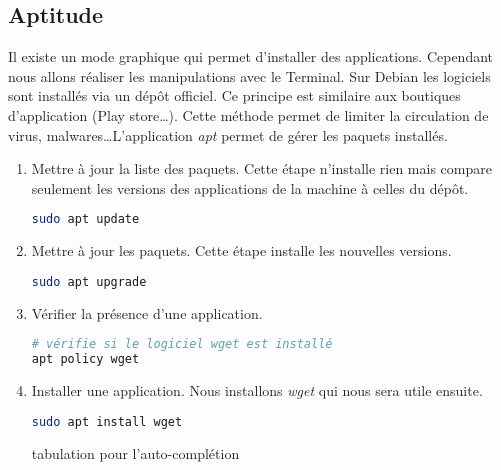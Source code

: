 \documentclass[a4paper,11pt]{article}
\begin{document}
\subsection{Aptitude}
Il existe un mode graphique qui permet d'installer des applications. Cependant nous allons réaliser les manipulations avec le Terminal. Sur Debian les logiciels sont installés via un dépôt officiel. Ce principe est similaire aux boutiques d'application (Play store\dots). Cette méthode permet de limiter la circulation de virus, malwares\dots L'application \emph{apt} permet de gérer les paquets installés.
\begin{activite}
\begin{enumerate}
    \item Mettre à jour la liste des paquets. Cette étape n'installe rien mais compare seulement les versions des applications de la machine à celles du dépôt.
    \begin{lstlisting}[language=bash]
sudo apt update
            \end{lstlisting}
    \item Mettre à jour les paquets. Cette étape installe les nouvelles versions.
    \begin{lstlisting}[language=bash]
sudo apt upgrade
            \end{lstlisting}
    \item Vérifier la présence d'une application.
    \begin{lstlisting}[language=bash]
# vérifie si le logiciel wget est installé
apt policy wget
            \end{lstlisting}
    \item Installer une application. Nous installons \emph{wget} qui nous sera utile ensuite.
    \begin{lstlisting}[language=bash]
sudo apt install wget
            \end{lstlisting}
            \begin{commentprof}
            tabulation pour l'auto-complétion
            \end{commentprof}
\end{enumerate}
\end{activite}
\end{document}
